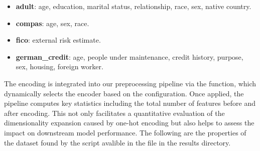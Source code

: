 \begin{itemize} \label{act-feat}
    \item \textbf{adult}: age, education, marital status, relationship, race, sex, native country.
    \item \textbf{compas}: age, sex, race.
    \item \textbf{fico}: external risk estimate.
    \item \textbf{german\_credit}: age, people under maintenance, credit history, purpose, sex, housing, foreign worker.

\end{itemize}

The encoding is integrated into our preprocessing pipeline via the  function, which dynamically selects the encoder based on the configuration. Once applied, the pipeline computes key statistics including the total number of features before and after encoding. This not only facilitates a quantitative evaluation of the dimensionality expansion caused by one-hot encoding but also helps to assess the impact on downstream model performance. The following are the properties of the dataset found by the  script avalible in the  file in the results directory.


\begin{table}[ht]
\centering
\hspace*{-2.5cm} 
\caption{Table that provides feature information about the datasets. \textbf{Num Recs} denotes the total number of records in the dataset. \textbf{Num Feat} represents the total number of features. \textbf{Num Cont Feat} shows the count of continuous (numerical) features, while \textbf{Num Cat Feat} indicates the count of categorical (discrete) features. \textbf{Num of Act Feat} specifies the number of actionable features, and \textbf{Num of OHE Feat} displays the number of one-hot encoded features. Finally, \textbf{Num of Labels} refers to the number of label columns or target variables.}
\end{table}

